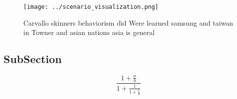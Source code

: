 \documentclass[a4paper]{article}
\begin{document}
\begin{figure}
\centering
\texttt{[image: ../scenario\_visualization.png]}
\caption{Carvallo skinners behaviorism did Were learned samsung and taiwan in Towner and asian nations asia is general
}
\end{figure}
 
\subsection{SubSection}

\[ \frac{1+\frac{a}{b}}{1+\frac{1}{1+\frac{1}{a}}} \]
\end{document}

